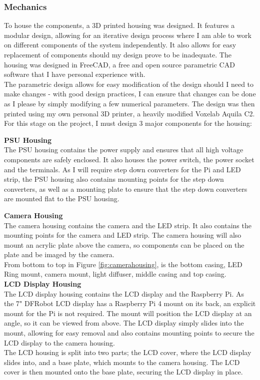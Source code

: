 \subsubsection{Mechanics} \label{sec:mechanics}
To house the components, a 3D printed housing was designed. It features a modular design, allowing for an iterative design process
where I am able to work on different components of the system independently. It also allows for easy replacement of components
should my design prove to be inadequate. The housing was designed in FreeCAD\cite{freecad}, a free and open source parametric CAD software 
that I have personal experience with. \\
The parametric design allows for easy modification of the design should I need to make changes -
with good design practices, I can ensure that changes can be done as I please by simply modifying a few numerical parameters.
The design was then printed using my own personal 3D printer, a heavily modified Voxelab Aquila C2. For this stage on the project,
I must design 3 major components for the housing:

\noindent
\textbf{PSU Housing} \\
The PSU housing contains the power supply and ensures that all high voltage components are safely enclosed.
It also houses the power switch, the power socket and the terminals. As I will require step down converters for the Pi and LED strip,
the PSU housing also contains mounting points for the step down converters, as well as a mounting plate to ensure that the step down converters
are mounted flat to the PSU housing.

\noindent
\textbf{Camera Housing} \\
The camera housing contains the camera and the LED strip. It also contains the mounting points for the camera and LED strip.
The camera housing will also mount an acrylic plate above the camera, so components can be placed on the plate and be imaged by the camera. \\
From bottom to top in Figure \ref*{fig:camerahousing}, is the bottom casing, LED Ring mount, camera mount, light diffuser, middle casing and
top casing. \\

\noindent
\textbf{LCD Display Housing} \\
The LCD display housing contains the LCD display and the Raspberry Pi. As the 7" DFRobot LCD display has a Raspberry Pi 4 mount on its back,
an explicit mount for the Pi is not required. The mount will position the LCD display at an angle, so it can be viewed from above. The LCD display
simply slides into the mount, allowing for easy removal and also contains mounting points to secure the LCD display to the camera housing. \\
The LCD housing is split into two parts; the LCD cover, where the LCD display slides into, and a base plate, which mounts to the camera housing.
The LCD cover is then mounted onto the base plate, securing the LCD display in place.

